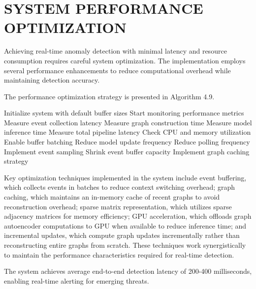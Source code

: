 \section{\uppercase{SYSTEM PERFORMANCE OPTIMIZATION}}

Achieving real-time anomaly detection with minimal latency and resource consumption requires careful system optimization. The implementation employs several performance enhancements to reduce computational overhead while maintaining detection accuracy.

The performance optimization strategy is presented in Algorithm 4.9.

\begin{algorithm}
\caption{Performance Optimization and Latency Management}
\begin{algorithmic}[1] %
\State Initialize system with default buffer sizes
\State Start monitoring performance metrics
    \State Measure event collection latency
    \State Measure graph construction time
    \State Measure model inference time
    \State Measure total pipeline latency
    \State Check CPU and memory utilization
        \State Enable buffer batching
        \State Reduce model update frequency
        \State Reduce polling frequency
        \State Implement event sampling
        \State Shrink event buffer capacity
        \State Implement graph caching strategy
    \EndIf
\EndWhile
\end{algorithmic}
\end{algorithm}

Key optimization techniques implemented in the system include event buffering, which collects events in batches to reduce context switching overhead; graph caching, which maintains an in-memory cache of recent graphs to avoid reconstruction overhead; sparse matrix representation, which utilizes sparse adjacency matrices for memory efficiency; GPU acceleration, which offloads graph autoencoder computations to GPU when available to reduce inference time; and incremental updates, which compute graph updates incrementally rather than reconstructing entire graphs from scratch. These techniques work synergistically to maintain the performance characteristics required for real-time detection.

The system achieves average end-to-end detection latency of 200-400 milliseconds, enabling real-time alerting for emerging threats.



